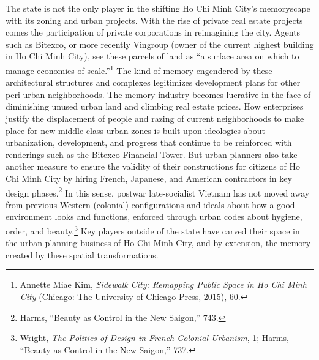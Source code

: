  The state is not the only player in the shifting Ho Chi Minh City's memoryscape with its zoning and urban projects. With the rise of private real estate projects comes the participation of private corporations in reimagining the city. Agents such as Bitexco, or more recently Vingroup (owner of the current highest building in Ho Chi Minh City), see these parcels of land as “a surface area on which to manage economies of scale.”\footnote{Annette Miae Kim, \textit{Sidewalk City: Remapping Public Space in Ho Chi Minh City} (Chicago: The University of Chicago Press, 2015), 60.} The kind of memory engendered by these architectural structures and complexes legitimizes development plans for other peri-urban neighborhoods. The memory industry becomes lucrative in the face of diminishing unused urban land and climbing real estate prices. How enterprises justify the displacement of people and razing of current neighborhoods to make place for new middle-class urban zones is built upon ideologies about urbanization, development, and progress that continue to be reinforced with renderings such as the Bitexco Financial Tower. But urban planners also take another measure to ensure the validity of their constructions for citizens of Ho Chi Minh City by hiring French, Japanese, and American contractors in key design phases.\footnote{Harms, “Beauty as Control in the New Saigon,” 743.} In this sense, postwar late-socialist Vietnam has not moved away from previous Western (colonial) configurations and ideals about how a good environment looks and functions, enforced through urban codes about hygiene, order, and beauty.\footnote{Wright, \textit{The Politics of Design in French Colonial Urbanism}, 1; Harms, “Beauty as Control in the New Saigon,” 737.} Key players outside of the state have carved their space in the urban planning business of Ho Chi Minh City, and by extension, the memory created by these spatial transformations.

